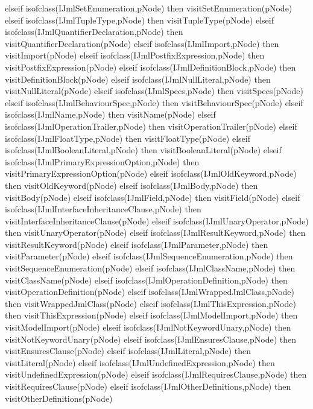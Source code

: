 \begin{vdm_al}
      elseif isofclass(IJmlSetEnumeration,pNode) then visitSetEnumeration(pNode)
      elseif isofclass(IJmlTupleType,pNode) then visitTupleType(pNode)
      elseif isofclass(IJmlQuantifierDeclaration,pNode) then visitQuantifierDeclaration(pNode)
      elseif isofclass(IJmlImport,pNode) then visitImport(pNode)
      elseif isofclass(IJmlPostfixExpression,pNode) then visitPostfixExpression(pNode)
      elseif isofclass(IJmlDefinitionBlock,pNode) then visitDefinitionBlock(pNode)
      elseif isofclass(IJmlNullLiteral,pNode) then visitNullLiteral(pNode)
      elseif isofclass(IJmlSpecs,pNode) then visitSpecs(pNode)
      elseif isofclass(IJmlBehaviourSpec,pNode) then visitBehaviourSpec(pNode)
      elseif isofclass(IJmlName,pNode) then visitName(pNode)
      elseif isofclass(IJmlOperationTrailer,pNode) then visitOperationTrailer(pNode)
      elseif isofclass(IJmlFloatType,pNode) then visitFloatType(pNode)
      elseif isofclass(IJmlBooleanLiteral,pNode) then visitBooleanLiteral(pNode)
      elseif isofclass(IJmlPrimaryExpressionOption,pNode) then visitPrimaryExpressionOption(pNode)
      elseif isofclass(IJmlOldKeyword,pNode) then visitOldKeyword(pNode)
      elseif isofclass(IJmlBody,pNode) then visitBody(pNode)
      elseif isofclass(IJmlField,pNode) then visitField(pNode)
      elseif isofclass(IJmlInterfaceInheritanceClause,pNode) then visitInterfaceInheritanceClause(pNode)
      elseif isofclass(IJmlUnaryOperator,pNode) then visitUnaryOperator(pNode)
      elseif isofclass(IJmlResultKeyword,pNode) then visitResultKeyword(pNode)
      elseif isofclass(IJmlParameter,pNode) then visitParameter(pNode)
      elseif isofclass(IJmlSequenceEnumeration,pNode) then visitSequenceEnumeration(pNode)
      elseif isofclass(IJmlClassName,pNode) then visitClassName(pNode)
      elseif isofclass(IJmlOperationDefinition,pNode) then visitOperationDefinition(pNode)
      elseif isofclass(IJmlWrappedJmlClass,pNode) then visitWrappedJmlClass(pNode)
      elseif isofclass(IJmlThisExpression,pNode) then visitThisExpression(pNode)
      elseif isofclass(IJmlModelImport,pNode) then visitModelImport(pNode)
      elseif isofclass(IJmlNotKeywordUnary,pNode) then visitNotKeywordUnary(pNode)
      elseif isofclass(IJmlEnsuresClause,pNode) then visitEnsuresClause(pNode)
      elseif isofclass(IJmlLiteral,pNode) then visitLiteral(pNode)
      elseif isofclass(IJmlUndefinedExpression,pNode) then visitUndefinedExpression(pNode)
      elseif isofclass(IJmlRequiresClause,pNode) then visitRequiresClause(pNode)
      elseif isofclass(IJmlOtherDefinitions,pNode) then visitOtherDefinitions(pNode)

\end{vdm_al}
